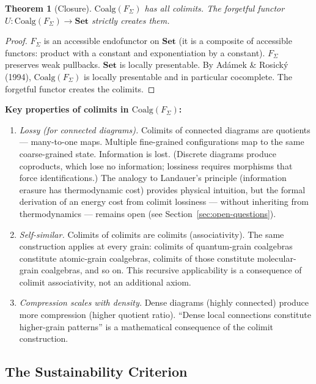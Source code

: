 \documentclass[12pt,a4paper]{article}
\newtheorem{theorem}{Theorem}
\begin{document}
\begin{theorem}[Closure]
\label{thm:closure}
$\text{Coalg}(F_\Sigma)$ has all colimits. The forgetful functor $U : \text{Coalg}(F_\Sigma) \to \mathbf{Set}$ strictly creates them.
\end{theorem}

\begin{proof}
$F_\Sigma$ is an accessible endofunctor on $\mathbf{Set}$ (it is a composite of accessible functors: product with a constant and exponentiation by a constant). $F_\Sigma$ preserves weak pullbacks. $\mathbf{Set}$ is locally presentable. By Ad\'amek \& Rosick\'y (1994), $\text{Coalg}(F_\Sigma)$ is locally presentable and in particular cocomplete. The forgetful functor creates the colimits.
\end{proof}

\textbf{Key properties of colimits in $\text{Coalg}(F_\Sigma)$:}

\begin{enumerate}
  \item \emph{Lossy (for connected diagrams).} Colimits of connected diagrams are quotients --- many-to-one maps. Multiple fine-grained configurations map to the same coarse-grained state. Information is lost. (Discrete diagrams produce coproducts, which lose no information; lossiness requires morphisms that force identifications.) The analogy to Landauer's principle (information erasure has thermodynamic cost) provides physical intuition, but the formal derivation of an energy cost from colimit lossiness --- without inheriting from thermodynamics --- remains open (see Section~\ref{sec:open-questions}).

  \item \emph{Self-similar.} Colimits of colimits are colimits (associativity). The same construction applies at every grain: colimits of quantum-grain coalgebras constitute atomic-grain coalgebras, colimits of those constitute molecular-grain coalgebras, and so on. This recursive applicability is a consequence of colimit associativity, not an additional axiom.

  \item \emph{Compression scales with density.} Dense diagrams (highly connected) produce more compression (higher quotient ratio). ``Dense local connections constitute higher-grain patterns'' is a mathematical consequence of the colimit construction.
\end{enumerate}

\subsection{The Sustainability Criterion}
\label{sec:sustainability}
\end{document}
